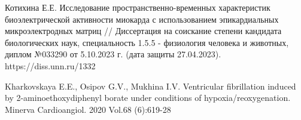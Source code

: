 \begin{thebibliography}{00}
	Котихина Е.Е. Исследование пространственно-временных характеристик
	биоэлектрической активности миокарда с использованием эпикардиальных
	микроэлектродных матриц // Диссертация на соискание степени кандидата
	биологических наук, специальность 1.5.5 - физиология человека и животных,
	диплом №033290 от 5.10.2023 г. (дата защиты 27.04.2023).
	https://diss.unn.ru/1332

	Kharkovskaya E.E., Osipov G.V., Mukhina I.V. Ventricular fibrillation
	induced by 2-aminoethoxydiphenyl borate under conditions of
	hypoxia/reoxygenation. Minerva Cardioangiol. 2020 Vol.68 (6):619-28

\end{thebibliography}
\endgroup
